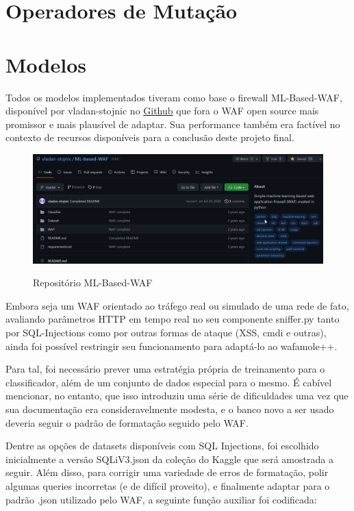\section{Operadores de Mutação}

\section{Modelos}
Todos os modelos implementados tiveram como base o firewall ML-Based-WAF, disponível por vladan-stojnic no \href{https://github.com/vladan-stojnic/ML-based-WAF}{Github} que fora o WAF open source mais promissor e mais plausível de adaptar. Sua performance também era factível no contexto de recursos disponíveis para a conclusão deste projeto final.

\begin{figure}[ht]
    \centering
    \caption{Repositório ML-Based-WAF}
    \includegraphics[width=16cm]{figuras/MLBasedWAF.png} 
    \label{fig:internet} 
\end{figure}

Embora seja um WAF orientado ao tráfego real ou simulado de uma rede de fato, avaliando parâmetros HTTP em tempo real no seu componente sniffer.py tanto por SQL-Injections como por outras formas de ataque (XSS, cmdi e outras), ainda foi possível restringir seu funcionamento para adaptá-lo ao wafamole++. 

Para tal, foi necessário prever uma estratégia própria de treinamento para o classificador, além de um conjunto de dados especial para o mesmo. É cabível mencionar, no entanto, que isso introduziu uma série de dificuldades uma vez que sua documentação era consideravelmente modesta, e o banco novo a ser usado deveria seguir o padrão de formatação seguido pelo WAF.

Dentre as opções de datasets disponíveis com SQL Injections, foi escolhido inicialmente a versão SQLiV3.json da coleção do Kaggle que será amostrada a seguir.
Além disso, para corrigir uma variedade de erros de formatação, polir algumas queries incorretas (e de difícil proveito), e finalmente adaptar para o padrão .json utilizado pelo WAF, a seguinte função auxiliar foi codificada:

